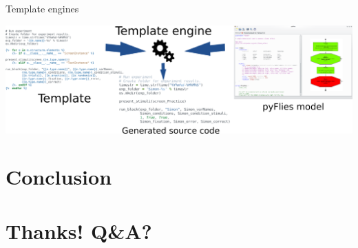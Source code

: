 \documentclass[presentation]{beamer}
\begin{document}
\begin{frame}[label={sec:orgc5af548}]{Template engines}
\begin{center}
\includegraphics[width=1\textwidth]{./images/template_engine.png}
\end{center} 
\end{frame}

\section*{Conclusion}
\label{sec:org3ec729e}
\section*{Thanks! Q\&A?}
\label{sec:orgbee0eb6}
\end{document}
